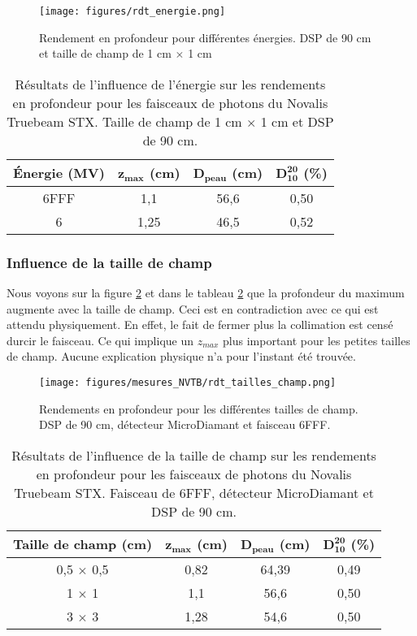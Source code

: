 \documentclass{article}
\begin{document}
\begin{figure}[h]
  \centering
  \texttt{[image: figures/rdt\_energie.png]}
  \caption{Rendement en profondeur pour différentes énergies. DSP de 90 cm et taille de champ de 1 cm $\times$ 1 cm}
  \label{fig_rdt_energie}
\end{figure}

\begin{table}[h]
  \centering
  \begin{tabular}{cccc}
    \toprule
    \bfseries Énergie (MV) & $\mathbf{z_{max}}$ \textbf{(cm)} & $\mathbf{D_{peau}}$ \textbf{(cm)} & $\mathbf{D^{20}_{10}}$ \textbf{(\%)} \\
    \toprule
    6FFF & 1,1 & 56,6 & 0,50 \\
    6 & 1,25 & 46,5 & 0,52 \\
    \bottomrule
  \end{tabular}
  \caption{Résultats de l'influence de l'énergie sur les rendements en profondeur pour les faisceaux de photons du Novalis Truebeam STX. Taille de champ de 1 cm $\times$ 1 cm et DSP de 90 cm.}
  \label{table_rdt_energie}
\end{table}

\subsubsection{Influence de la taille de champ}

Nous voyons sur la figure \ref*{fig_rdt_tailles_champ} et dans le tableau \ref*{table_rdt_taille_champ} que la profondeur du maximum augmente avec la taille de champ. Ceci est en contradiction avec ce qui est attendu physiquement. En effet, le fait de fermer plus la collimation est censé durcir le faisceau. Ce qui implique un $z_{max}$ plus important pour les petites tailles de champ. Aucune explication physique n'a pour l'instant été trouvée.

\begin{figure}[h]
  \centering
  \texttt{[image: figures/mesures\_NVTB/rdt\_tailles\_champ.png]}
  \caption{Rendements en profondeur pour les différentes tailles de champ. DSP de 90  cm, détecteur MicroDiamant et faisceau 6FFF.}
  \label{fig_rdt_tailles_champ}
\end{figure}

\begin{table}[h]
  \centering
  \begin{tabular}{cccc}
    \toprule
    \bfseries Taille de champ (cm) & $\mathbf{z_{max}}$ \textbf{(cm)} & $\mathbf{D_{peau}}$ \textbf{(cm)} & $\mathbf{D^{20}_{10}}$ \textbf{(\%)} \\
    \toprule
    0,5 $\times$ 0,5 & 0,82 & 64,39 & 0,49 \\
    1 $\times$ 1 & 1,1 & 56,6 & 0,50 \\
    3 $\times$ 3 & 1,28 & 54,6 & 0,50 \\
    \bottomrule
  \end{tabular}
  \caption{Résultats de l'influence de la taille de champ sur les rendements en profondeur pour les faisceaux de photons du Novalis Truebeam STX. Faisceau de 6FFF, détecteur MicroDiamant et DSP de 90 cm.}
  \label{table_rdt_taille_champ}
\end{table}
\end{document}
